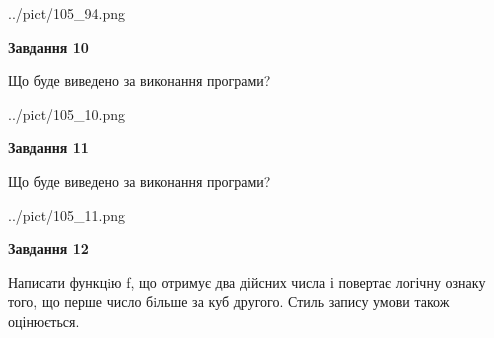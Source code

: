 \documentclass[12pt, ukrainian]{article}
\begin{document}
{\begin {large}
\begin{center}
	{../pict/105_94.png}
\end{center}
\newpage

{\begin {center}\textbf{Завдання 10}\end {center}}

Що буде виведено за виконання програми?\par
\begin{center}
	{../pict/105_10.png}
\end{center}
\newpage

{\begin {center}\textbf{Завдання 11}\end {center}}

Що буде виведено за виконання програми?\par
\begin{center}
	{../pict/105_11.png}
\end{center}
\newpage

{\begin {center}\textbf{Завдання 12}\end {center}}


Написати функцiю f, що отримує два дійсних числа і повертає логічну ознаку того, що перше число бiльше за куб другого. Стиль запису умови також оцінюється.\par
\newpage

\end {large}}
\end{document}
